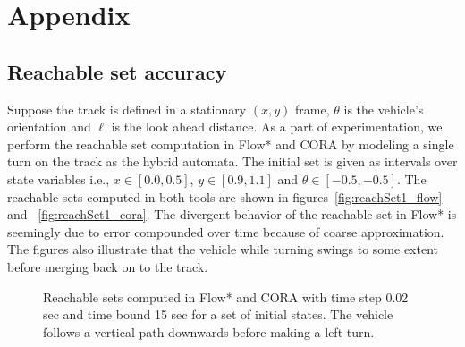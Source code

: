 \section{Appendix}

\subsection{Reachable set accuracy}
\label{subsec:appendix-reach-set-accuracy}
Suppose the track is defined in a stationary $(x, y)$ frame, $\theta$ is the vehicle's orientation and 
$\ell$ is the look ahead distance. 
%
As a part of experimentation, we perform the reachable set computation in Flow* and CORA by modeling a single turn on the track as the hybrid automata. 
%
The initial set is given as intervals over state variables i.e., $x \in [0.0, 0.5]$, $y \in [0.9, 1.1]$ and $\theta \in [-0.5, -0.5]$. 
%
The reachable sets computed in both tools are shown in figures~\ref{fig:reachSet1_flow} and ~\ref{fig:reachSet1_cora}. 
%
The divergent behavior of the reachable set in Flow* is seemingly due to error compounded over time because of coarse approximation. 
%
The figures also illustrate that the vehicle while turning swings to some extent before merging back on to the track.

\begin{figure}
    \centering
    \caption{Reachable sets computed in Flow* and CORA with time step 0.02 sec and time bound 15 sec for a set of initial states. The vehicle follows a vertical path downwards before making  a left turn.}
\label{fig:reachSets}
\end{figure}

